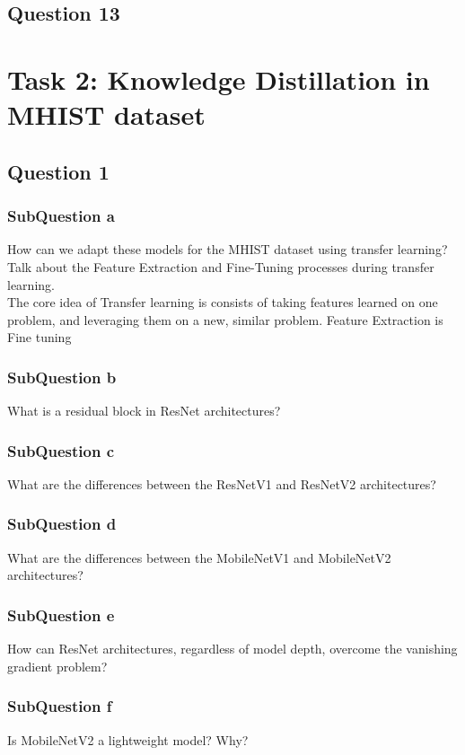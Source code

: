 \documentclass[conference]{IEEEtran}
\begin{document}
\subsection{Question 13}

\section{Task 2: Knowledge Distillation in MHIST dataset}

\subsection{Question 1}
\subsubsection{SubQuestion a} How can we adapt these models for the MHIST dataset using transfer learning? Talk about the Feature Extraction and Fine-Tuning processes during transfer learning.\\

The core idea of Transfer learning is consists of taking features learned on one problem, and leveraging them on a new, similar problem.\cite{keras}
Feature Extraction is 
\\
Fine tuning
\cite{blog}
\subsubsection{SubQuestion b} What is a residual block in ResNet architectures?
\subsubsection{SubQuestion c} What are the differences between the ResNetV1 and ResNetV2 architectures?
\subsubsection{SubQuestion d} What are the differences between the MobileNetV1 and MobileNetV2 architectures?
\subsubsection{SubQuestion e} How can ResNet architectures, regardless of model depth, overcome the vanishing gradient problem?
\subsubsection{SubQuestion f} Is MobileNetV2 a lightweight model? Why?
\end{document}
